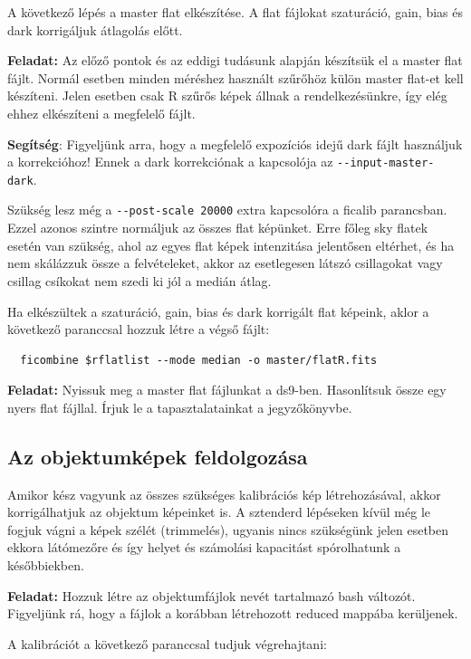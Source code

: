 \documentclass{article}
\begin{document}
A következő lépés a master flat elkészítése. A flat fájlokat szaturáció, gain,
bias és dark korrigáljuk átlagolás előtt.

{\bf Feladat:}
Az előző pontok és az eddigi tudásunk alapján készítsük el a master flat fájlt.
Normál esetben minden méréshez használt szűrőhöz külön master flat-et kell
készíteni. Jelen esetben csak R szűrős képek állnak a rendelkezésünkre, így elég
ehhez elkészíteni a megfelelő fájlt.

{\bf Segítség}:
Figyeljünk arra, hogy a megfelelő expozíciós idejű dark fájlt használjuk a
korrekcióhoz! Ennek a dark korrekciónak a kapcsolója az \verb+--input-master-dark+.

Szükség lesz még a \verb+--post-scale 20000+ extra kapcsolóra a ficalib parancsban.
Ezzel azonos szintre normáljuk az összes flat képünket. Erre főleg sky flatek
esetén van szükség, ahol az egyes flat képek intenzitása jelentősen eltérhet,
és ha nem skálázzuk össze a felvételeket, akkor az esetlegesen látszó csillagokat
vagy csillag csíkokat nem szedi ki jól a medián átlag.

Ha elkészültek a szaturáció, gain, bias és dark korrigált flat képeink, aklor a
következő paranccsal hozzuk létre a végső fájlt:

\begin{verbatim}
  ficombine $rflatlist --mode median -o master/flatR.fits
\end{verbatim}

{\bf Feladat:}
Nyissuk meg a master flat fájlunkat a ds9-ben. Hasonlítsuk össze egy nyers flat
fájllal. Írjuk le a tapasztalatainkat a jegyzőkönyvbe.


\subsection{Az objektumképek feldolgozása}

Amikor kész vagyunk az összes szükséges kalibrációs kép létrehozásával, akkor
korrigálhatjuk az objektum képeinket is. A sztenderd lépéseken kívül még le
fogjuk vágni a képek szélét (trimmelés), ugyanis nincs szükségünk jelen esetben
ekkora látómezőre és így helyet és számolási kapacitást spórolhatunk a
későbbiekben.

{\bf Feladat:}
Hozzuk létre az objektumfájlok nevét tartalmazó bash változót. Figyeljünk rá,
hogy a fájlok a korábban létrehozott reduced mappába kerüljenek.

A kalibrációt a következő paranccsal tudjuk végrehajtani:
\end{document}
